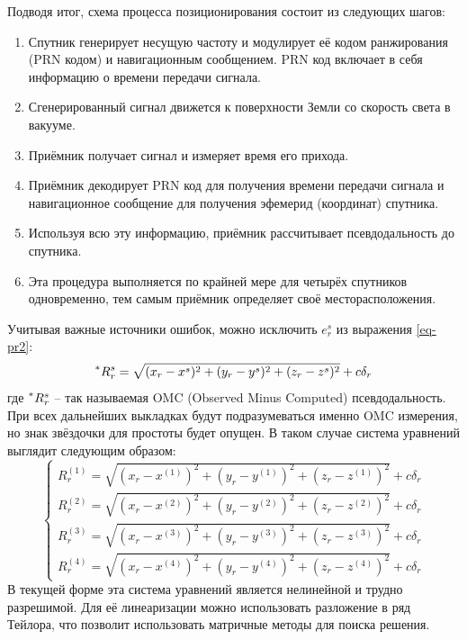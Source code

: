 Подводя итог, схема процесса позиционирования состоит из следующих шагов:
\begin{enumerate}
\item Спутник генерирует несущую частоту и модулирует её кодом ранжирования (PRN кодом) и навигационным сообщением.
PRN код включает в себя информацию о времени передачи сигнала. 
\item Сгенерированный сигнал движется к поверхности Земли со скорость света в вакууме.
\item Приёмник получает сигнал и измеряет время его прихода.
\item Приёмник декодирует PRN код для получения времени передачи сигнала и навигационное сообщение для получения эфемерид (координат) спутника.
\item Используя всю эту информацию, приёмник рассчитывает псевдодальность до спутника.
\item Эта процедура выполняется по крайней мере для четырёх спутников одновременно, тем самым приёмник определяет своё месторасположения.
\end{enumerate}

Учитывая важные источники ошибок, можно исключить $e_r^s$ из выражения \eqref{eq-pr2}:
\begin{equation}
\prescript{*}{}R_r^s=\sqrt{(x_r-x^s)^2+(y_r-y^s)^2+(z_r-z^s)^2}+c\delta_r
\end{equation}
где 
$\prescript{*}{}R_r^s$ -- так называемая OMC (Observed Minus Computed) псевдодальность. 
При всех дальнейших выкладках будут подразумеваться именно OMC измерения, но знак звёздочки для простоты будет опущен.
В таком случае система уравнений выглядит следующим образом:
\begin{equation}
\label{eq-pr-system}
\begin{cases}
R_r^{(1)}=\sqrt{(x_r-x^{(1)})^2+(y_r-y^{(1)})^2+(z_r-z^{(1)})^2}+c\delta_r \\ 
R_r^{(2)}=\sqrt{(x_r-x^{(2)})^2+(y_r-y^{(2)})^2+(z_r-z^{(2)})^2}+c\delta_r \\
R_r^{(3)}=\sqrt{(x_r-x^{(3)})^2+(y_r-y^{(3)})^2+(z_r-z^{(3)})^2}+c\delta_r \\
R_r^{(4)}=\sqrt{(x_r-x^{(4)})^2+(y_r-y^{(4)})^2+(z_r-z^{(4)})^2}+c\delta_r
\end{cases}
\end{equation}
В текущей форме эта система уравнений является нелинейной и трудно разрешимой.
Для её линеаризации можно использовать разложение в ряд Тейлора, что позволит использовать матричные методы для поиска решения. 

